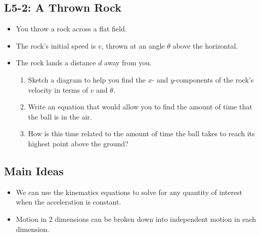 \documentclass[]{article}
\begin{document}
\begin{PresentSpace}
	\vspace{-10pt}
	\section*{L5-2: A Thrown Rock}
	\vspace{-10pt}
	\begin{itemize}
		\item You throw a rock across a flat field.
		\item The rock's initial speed is $v$, thrown at an angle $\theta$ above the horizontal.
		\item The rock lands a distance $d$ away from you.
		\begin{enumerate}[(1)]
			\item Sketch a diagram to help you find the $x$- and $y$-components of the rock's velocity in terms of $v$ and $\theta$.
			\item Write an equation that would allow you to find the amount of time that the ball is in the air.
			\item How is this time related to the amount of time the ball takes to reach its highest point above the ground?
		\end{enumerate}
	\end{itemize}
\end{PresentSpace}
\newpage
\begin{TeacherMargin}

\end{TeacherMargin}
\begin{PresentSpace}
\section*{Main Ideas}
\begin{itemize}
	\item We can use the kinematics equations to solve for any quantity of interest when the acceleration is constant.
	\item Motion in 2 dimensions can be broken down into independent motion in each dimension.
\end{itemize}
\end{PresentSpace}
\end{document}
